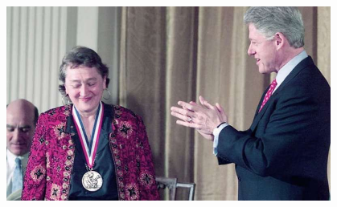 \documentclass[10pt]{beamer}
\begin{document}
\begin{frame}
	\begin{center}
		\includegraphics[width=0.8\textwidth]{figures/Margulis2.jpg}
	\end{center}
\end{frame}
\end{document}

